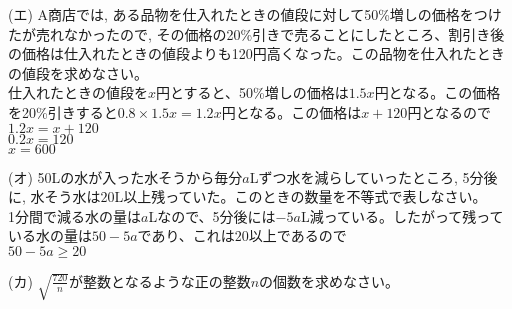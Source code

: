 \documentclass{ltjsarticle}
\begin{document}
(エ) A商店では, ある品物を仕入れたときの値段に対して50\%増しの価格をつけたが売れなかったので, その価格の20\%引きで売ることにしたところ、割引き後の価格は仕入れたときの値段よりも120円高くなった。この品物を仕入れたときの値段を求めなさい。
 \\ 仕入れたときの値段を$x$円とすると、50\%増しの価格は$1.5x$円となる。この価格を20\%引きすると$0.8\times1.5x=1.2x$円となる。この価格は$x+120$円となるので
 \\ $1.2x = x + 120$
 \\ $0.2x = 120$
 \\ $x = 600$

(オ) 50Lの水が入った水そうから毎分$a$Lずつ水を減らしていったところ, 5分後に, 水そう水は$20$L以上残っていた。このときの数量を不等式で表しなさい。
 \\ 1分間で減る水の量は$a$Lなので、5分後には$-5a$L減っている。したがって残っている水の量は$50-5a$であり、これは$20$以上であるので
 \\ $50-5a \geq 20$

(カ) $\sqrt{\frac{720}{n}}$が整数となるような正の整数$n$の個数を求めなさい。
\end{document}
